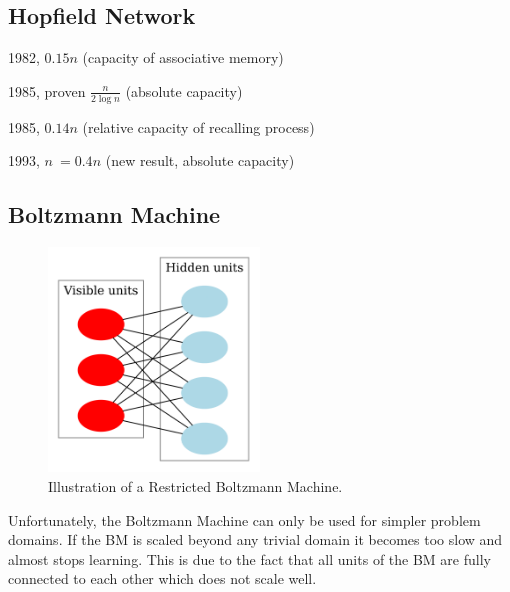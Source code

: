 \documentclass[12pt, a4paper]{article}
\begin{document}
\subsection{Hopfield Network}


1982, $0.15n$ (capacity of associative memory)


1985, proven $ \frac{n}{2\log{n}} $ (absolute capacity)

1985, $0.14n$ (relative capacity of recalling process)

1993, $ n ~= 0.4n $ (new result, absolute capacity)

\subsection{Boltzmann Machine}


\begin{figure}[htbp]
	\begin{center}
		\includegraphics[width=0.5\textwidth]{inc/Restricted_Boltzmann_machine.png}
		\caption{Illustration of a Restricted Boltzmann Machine.\protect\footnotemark}
		\label{fig:restricted_boltzmann_machine}
	\end{center}
\end{figure}

Unfortunately, the Boltzmann Machine can only be used for simpler problem domains. If the BM is scaled beyond any trivial domain it becomes too slow and almost stops learning. This is due to the fact that all units of the BM are fully connected to each other which does not scale well.
\end{document}
